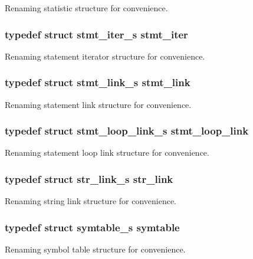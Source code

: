 Renaming statistic structure for convenience. 
\subsubsection{\setlength{\rightskip}{0pt plus 5cm}typedef struct {\bf stmt\_\-iter\_\-s} {\bf stmt\_\-iter}}\label{defines_8h_a163}


Renaming statement iterator structure for convenience. 
\subsubsection{\setlength{\rightskip}{0pt plus 5cm}typedef struct {\bf stmt\_\-link\_\-s} {\bf stmt\_\-link}}\label{defines_8h_a165}


Renaming statement link structure for convenience. 
\subsubsection{\setlength{\rightskip}{0pt plus 5cm}typedef struct {\bf stmt\_\-loop\_\-link\_\-s} {\bf stmt\_\-loop\_\-link}}\label{defines_8h_a166}


Renaming statement loop link structure for convenience. 
\subsubsection{\setlength{\rightskip}{0pt plus 5cm}typedef struct {\bf str\_\-link\_\-s} {\bf str\_\-link}}\label{defines_8h_a156}


Renaming string link structure for convenience. 
\subsubsection{\setlength{\rightskip}{0pt plus 5cm}typedef struct {\bf symtable\_\-s} {\bf symtable}}\label{defines_8h_a172}


Renaming symbol table structure for convenience. 
